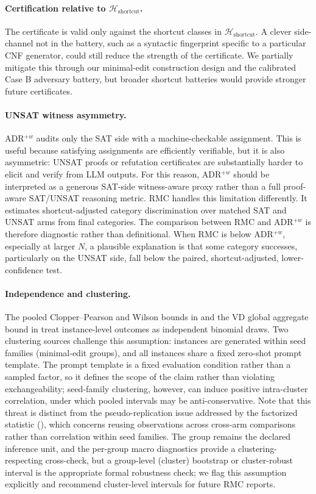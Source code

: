 \documentclass[conference]{IEEEtran}
\theoremstyle{remark}
\newcommand{\shortcutHypCls}{\mathcal{H}_{\mathrm{shortcut}}}
\begin{document}
\paragraph{Certification relative to $\shortcutHypCls$.}
The certificate is valid only against the shortcut classes in $\shortcutHypCls$.
A clever side-channel not in the battery, such as a syntactic fingerprint specific to a particular CNF generator, could still reduce the strength of the certificate.
We partially mitigate this through our minimal-edit construction design and the calibrated Case B adversary battery, but broader shortcut batteries would provide stronger future certificates.

\paragraph{UNSAT witness asymmetry.}
ADR$^{+w}$ audits only the SAT side with a machine-checkable assignment.  This is useful because satisfying assignments are efficiently verifiable, but it is also asymmetric: UNSAT proofs or refutation certificates are substantially harder to elicit and verify from LLM outputs.  For this reason, ADR$^{+w}$ should be interpreted as a generous SAT-side witness-aware proxy rather than a full proof-aware SAT/UNSAT reasoning metric.  RMC handles this limitation differently.  It estimates shortcut-adjusted category discrimination over matched SAT and UNSAT arms from final categories.  The comparison between RMC and ADR$^{+w}$ is therefore diagnostic rather than definitional.  When RMC is below ADR$^{+w}$, especially at larger $N$, a plausible explanation is that some category successes, particularly on the UNSAT side, fall below the paired, shortcut-adjusted, lower-confidence test.

\paragraph{Independence and clustering.}
The pooled Clopper--Pearson and Wilson bounds in  and the VD global aggregate bound in  treat instance-level outcomes as independent binomial draws.
Two clustering sources challenge this assumption: instances are generated within seed families (minimal-edit groups), and all instances share a fixed zero-shot prompt template.
The prompt template is a fixed evaluation condition rather than a sampled factor, so it defines the scope of the claim rather than violating exchangeability; seed-family clustering, however, can induce positive intra-cluster correlation, under which pooled intervals may be anti-conservative.
Note that this threat is distinct from the pseudo-replication issue addressed by the factorized statistic (), which concerns reusing observations across cross-arm comparisons rather than correlation within seed families.
The group remains the declared inference unit, and the per-group macro diagnostics provide a clustering-respecting cross-check, but a group-level (cluster) bootstrap or cluster-robust interval is the appropriate formal robustness check; we flag this assumption explicitly and recommend cluster-level intervals for future RMC reports.
\end{document}
